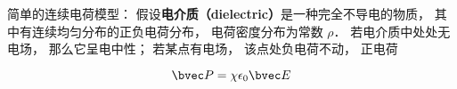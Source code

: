
简单的连续电荷模型： 假设\textbf{电介质（dielectric）}是一种完全不导电的物质， 其中有连续均匀分布的正负电荷分布， 电荷密度分布为常数 $\rho$． 若电介质中处处无电场， 那么它呈电中性； 若某点有电场， 该点处负电荷不动， 正电荷



\begin{equation}
\bvec P = \chi \epsilon_0 \bvec E
\end{equation}

